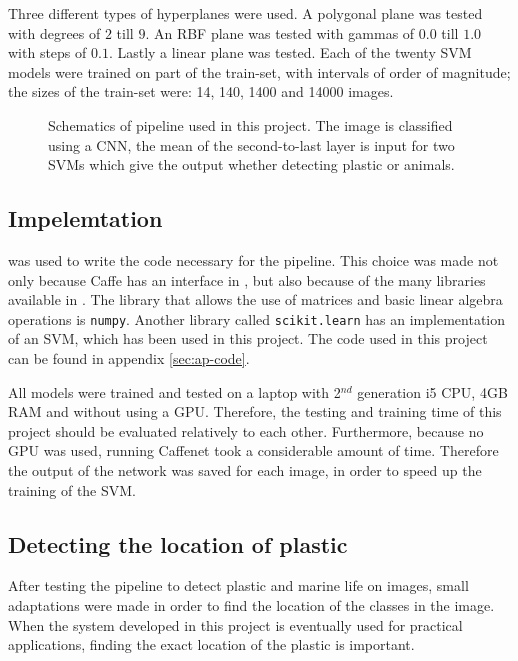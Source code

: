 Three different types of hyperplanes were used.
A polygonal plane was tested with degrees of $2$ till $9$.
An RBF plane was tested with gammas of $0.0$ till $1.0$ with steps of $0.1$.
Lastly a linear plane was tested.
Each of the twenty SVM models were trained on part of the train-set, with intervals of order of magnitude; the sizes of the train-set were: 14, 140, 1400 and 14000 images.

\begin{figure}
\centering
\ifx\showfig\undefined
 \fi
\caption{Schematics of pipeline used in this project. The image is classified using a CNN, the mean of the second-to-last layer is input for two SVMs which give the output whether detecting plastic or animals.}
\label{fig:pipeline}
\end{figure}


\subsection{Impelemtation}
\label{sec:Method-implementation}
{\Python} was used to write the code necessary for the pipeline.
This choice was made not only because Caffe has an interface in \Python, but also because of the many libraries available in \Python.
The library that allows the use of matrices and basic linear algebra operations is \texttt{numpy}.
Another library called \texttt{scikit.learn} has an implementation of an SVM, which has been used in this project.
The code used in this project can be found in appendix \ref{sec:ap-code}.

All models were trained and tested on a laptop with 2$^{nd}$ generation i5 CPU, 4GB RAM and without using a GPU. Therefore, the testing and training time of this project should be evaluated relatively to each other.
Furthermore, because no GPU was used, running Caffenet took a considerable amount of time. Therefore the output of the network was saved for each image, in order to speed up the training of the SVM.

\subsection{Detecting the location of plastic}
\label{sec:Method-location}
After testing the pipeline to detect plastic and marine life on images, small adaptations were made in order to find the location of the classes in the image.
When the system developed in this project is eventually used for practical applications, finding the exact location of the plastic is important.

